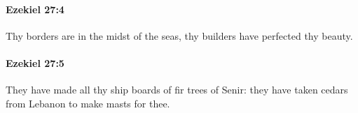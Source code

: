 		\paragraph{Ezekiel 27:4} %
			\label{EZEKIEL-27-4}

			Thy borders are in the midst of the seas, thy builders have perfected thy beauty.


		\paragraph{Ezekiel 27:5} %
			\label{EZEKIEL-27-5}

			They have made all thy ship boards of fir trees of Senir: they have taken cedars from Lebanon to make masts for thee.


